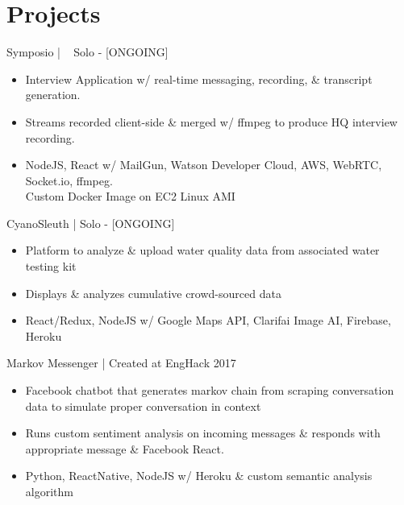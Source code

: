 \documentclass[]{friggeri-cv}
\begin{document}
\section{Projects}

\begin{entrylist}
	\entry
	{Symposio | \href{https://github.com/suzyng83209/symposio}{\faGithub} \ \href{http://symposiostream}{\faExternalLink}}
	{\vspace{0.5\parsep}Solo - [ONGOING]}
	{
		\begin{itemize}[leftmargin=*]
			\vspace{-0.4cm}
			\item Interview Application w/ real-time messaging, recording, \& transcript generation.
			\item Streams recorded client-side \& merged w/ ffmpeg to produce HQ interview recording.
			\item NodeJS, React w/ MailGun, Watson Developer Cloud, AWS, WebRTC, Socket.io, ffmpeg. \\ Custom Docker Image on EC2 Linux AMI  
		\end{itemize}
	}
	\entry
	{CyanoSleuth | \href{https://github.com/suzyng83209/cyanosleuth}{\faGithub}}
	{\vspace{0.5\parsep}Solo - [ONGOING]}
	{
		\begin{itemize}[leftmargin=*]
			\vspace{-0.4cm}
			\item Platform to analyze \& upload water quality data from associated water testing kit
			\item Displays \& analyzes cumulative crowd-sourced data
			\item React/Redux, NodeJS w/ Google Maps API, Clarifai Image AI, Firebase, Heroku
		\end{itemize}
	}
	\entry
	{Markov Messenger | \href{https://github.com/suzyng83209/markov-messenger-bot}{\faGithub}}
	{\vspace{0.5\parsep}Created at EngHack 2017}
	{
		\begin{itemize}[leftmargin=*]
			\vspace{-0.4cm}
			\item Facebook chatbot that generates markov chain from scraping conversation data to simulate proper conversation in context
			\item Runs custom sentiment analysis on incoming messages \& responds with appropriate message \& Facebook React.\
			\item Python, ReactNative, NodeJS w/ Heroku \& custom semantic analysis algorithm

\end{itemize}}
\end{entrylist}
\end{document}
